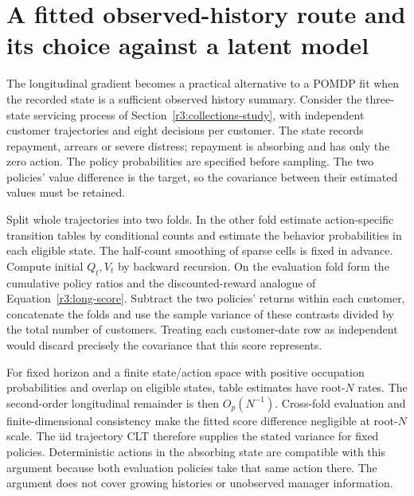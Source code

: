 \section{A fitted observed-history route and its choice against a latent model}
\label{s4:fitted-history}
The longitudinal gradient becomes a practical alternative to a POMDP fit
when the recorded state is a sufficient observed history summary. Consider
the three-state servicing process of Section~\ref{r3:collections-study},
with independent customer trajectories and eight decisions per customer.
The state records repayment, arrears or severe distress; repayment is
absorbing and has only the zero action. The policy probabilities are
specified before sampling. The two policies' value difference is the
target, so the covariance between their estimated values must be retained.

Split whole trajectories into two folds. In the other fold estimate
action-specific transition tables by conditional counts and estimate
the behavior probabilities in each eligible state. The half-count
smoothing of sparse cells is fixed in advance. Compute initial $Q_t,V_t$
by backward recursion. On the evaluation fold form the cumulative policy
ratios and the discounted-reward analogue of Equation~\eqref{r3:long-score}.
Subtract the two policies' returns within each customer, concatenate the
folds and use the sample variance of these contrasts divided by the total
number of customers. Treating each customer-date row as independent would
discard precisely the covariance that this score represents.

For fixed horizon and a finite state/action space with positive occupation
probabilities and overlap on eligible states, table estimates have root-$N$
rates. The second-order longitudinal remainder is then $O_p(N^{-1})$.
Cross-fold evaluation and finite-dimensional consistency make the fitted
score difference negligible at root-$N$ scale. The iid trajectory CLT
therefore supplies the stated variance for fixed policies. Deterministic
actions in the absorbing state are compatible with this argument because
both evaluation policies take that same action there. The argument does
not cover growing histories or unobserved manager information.

